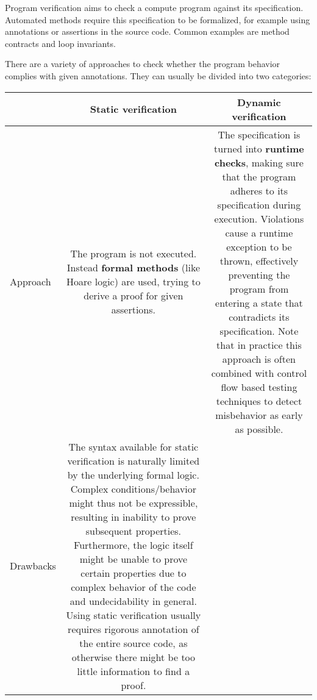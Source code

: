 Program verification aims to check a compute program against its specification.
Automated methods require this specification to be formalized, for example using annotations or assertions in the source code.
Common examples are method contracts and loop invariants.

There are a variety of approaches to check whether the program behavior complies with given annotations.
They can usually be divided into two categories:\\
\begin{tabular}{l | c | c}
     & Static verification & Dynamic verification \\ \hline
    Approach &
    \begin{minipage}{170pt}
        \vspace{3pt}
        The program is not executed. 
        Instead \textbf{formal methods} (like Hoare logic) are used, trying to derive a proof for given assertions.
        \vspace{5pt}
    \end{minipage}
    &
    \begin{minipage}{170pt}
        \vspace{3pt}
        The specification is turned into \textbf{runtime checks}, making sure that the program adheres to its specification during execution.
        Violations cause a runtime exception to be thrown, effectively preventing the program from entering a state that contradicts its specification.
        Note that in practice this approach is often combined with control flow based testing techniques to detect misbehavior as early as possible.
        \vspace{5pt}
    \end{minipage}\\\hline
    Drawbacks &
    \begin{minipage}{170pt}
        \vspace{3pt}
        The syntax available for static verification is naturally limited by the underlying formal logic.
        Complex conditions/behavior might thus not be expressible, resulting in inability to prove subsequent properties.
        Furthermore, the logic itself might be unable to prove certain properties due to complex behavior of the code and undecidability in general.
        Using static verification usually requires rigorous annotation of the entire source code, as otherwise there might be too little information to find a proof.

\end{minipage}
\end{tabular}
